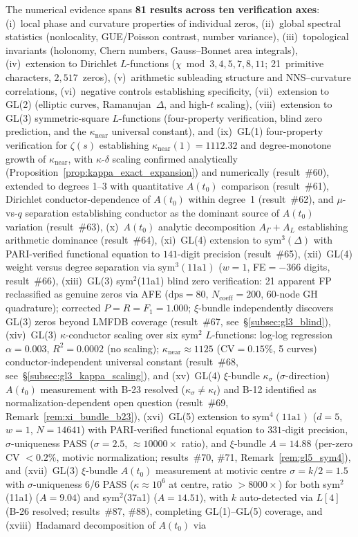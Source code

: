 \documentclass[11pt, a4paper]{article}
\theoremstyle{definition}
\theoremstyle{plain}
\begin{document}
The numerical evidence spans \textbf{81 results across ten verification
axes}: (i)~local phase and curvature properties of individual zeros,
(ii)~global spectral statistics (nonlocality, GUE/Poisson contrast,
number variance), (iii)~topological invariants (holonomy, Chern numbers,
Gauss--Bonnet area integrals), (iv)~extension to Dirichlet $L$-functions
($\chi \bmod 3,4,5,7,8,11$; 21~primitive characters, $2{,}517$~zeros), (v)~arithmetic subleading structure and
NNS--curvature correlations, (vi)~negative controls establishing
specificity, (vii)~extension to GL(2) (elliptic curves, Ramanujan~$\Delta$, and high-$t$ scaling), (viii)~extension to GL(3) symmetric-square $L$-functions (four-property verification, blind zero prediction, and the $\kappa_{\mathrm{near}}$ universal constant), and (ix)~GL(1) four-property verification for $\zeta(s)$ establishing $\kappa_{\mathrm{near}}(1){=}1112.32$ and degree-monotone growth of $\kappa_{\mathrm{near}}$, with $\kappa$-$\delta$ scaling confirmed analytically (Proposition~\ref{prop:kappa_exact_expansion}) and numerically (result~\#60), extended to degrees 1--3 with quantitative $A(t_0)$ comparison (result~\#61), Dirichlet conductor-dependence of $A(t_0)$ within degree~1 (result~\#62), and $\mu$-vs-$q$ separation establishing conductor as the dominant source of $A(t_0)$ variation (result~\#63), (x)~$A(t_0)$ analytic decomposition $A_\Gamma + A_L$ establishing arithmetic dominance (result~\#64), (xi)~GL(4) extension to $\mathrm{sym}^3(\Delta)$ with PARI-verified functional equation to $141$-digit precision (result~\#65), (xii)~GL(4) weight versus degree separation via $\mathrm{sym}^3(11\mathrm{a}1)$ ($w{=}1$, FE${=}-366$ digits, result~\#66), (xiii)~GL(3) sym$^2$(11a1) blind zero verification: 21 apparent FP reclassified as genuine zeros via AFE ($\mathrm{dps}{=}80$, $N_{\mathrm{coeff}}{=}200$, 60-node GH quadrature); corrected $P{=}R{=}F_1{=}1.000$; $\xi$-bundle independently discovers GL(3) zeros beyond LMFDB coverage (result~\#67, see~\S\ref{subsec:gl3_blind}), (xiv)~GL(3) $\kappa$-conductor scaling over six sym$^2$ $L$-functions: log-log regression $\alpha{=}0.003$, $R^2{=}0.0002$ (no scaling); $\kappa_{\mathrm{near}}{\approx}1125$ (CV${=}0.15\%$, 5 curves) conductor-independent universal constant (result~\#68, see~\S\ref{subsec:gl3_kappa_scaling}), and (xv)~GL(4) $\xi$-bundle $\kappa_\sigma$ ($\sigma$-direction) $A(t_0)$ measurement with B-23 resolved ($\kappa_\sigma \neq \kappa_t$) and B-12 identified as normalization-dependent open question (result~\#69, Remark~\ref{rem:xi_bundle_b23}), (xvi)~GL(5) extension to $\mathrm{sym}^4(11\mathrm{a}1)$ ($d{=}5$, $w{=}1$, $N{=}14641$) with PARI-verified functional equation to $331$-digit precision, $\sigma$-uniqueness PASS ($\sigma{=}2.5$, ${\approx}10000\times$ ratio), and $\xi$-bundle $A = 14.88$ (per-zero CV $< 0.2\%$, motivic normalization; results~\#70, \#71, Remark~\ref{rem:gl5_sym4}), and (xvii)~GL(3) $\xi$-bundle $A(t_0)$ measurement at motivic centre $\sigma = k/2 = 1.5$ with $\sigma$-uniqueness 6/6 PASS ($\kappa \approx 10^6$ at centre, ratio $> 8000\times$) for both sym$^2$(11a1) ($A{=}9.04$) and sym$^2$(37a1) ($A{=}14.51$), with $k$ auto-detected via $L[4]$ (B-26 resolved; results~\#87, \#88), completing GL(1)--GL(5) coverage, and (xviii)~Hadamard decomposition of $A(t_0)$ via 
\end{document}
